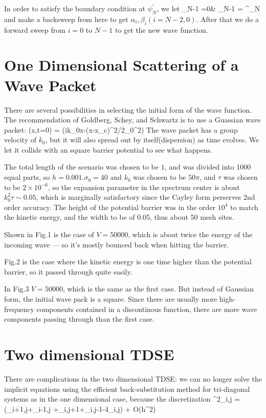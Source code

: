 In order to satisfy the boundary condition at $\psi^{\prime}_{N}$, we
let
\mm \alpha_{N-1} =0& \beta_{N-1} = \psi^{\prime}_{N} \md
and make a backsweep from here to get $\alpha_{i},\beta_{i}
(i=N-2,0)$. After that we do a forward sweep from $i=0$ to $N-1$ to
get the new wave function.

\section{One Dimensional Scattering of a Wave Packet}
There are several possibilities in selecting the initial form of the
wave function.  The recommendation of Goldberg, Schey, and Schwartz is
to use a Guassian wave packet:
\ee \Psi(x,t=0) = \exp(ik_{0}x-(x-x_{c})^{2}/2\sigma_{0}^{2}) \ed
The wave packet has a group velocity of $k_{0}$, but it will also
spread out by itself(dispersion) as time evolves. We let it collide
with an square barrier potential to see what happens.

The total length of the scenario was chosen to be $1$, and was divided
into 1000 equal parts, so $h=0.001$.$\sigma_{0} = 40$ and $k_{0}$ was
chosen to be $50\pi$, and $\tau$ was chosen to be $2\times 10^{-6}$,
so the expansion parameter in the spectrum center is about
$k_{0}^{2}\tau
\sim 0.05$, which is marginally satisfactory since the Cayley form
perserves 2nd order accuracy. The height of the potential barrier was
in the order $10^4$ to match the kinetic energy, and the width to be
of 0.05, thus about 50 mesh sites.

Shown in Fig.1 is the case of $V=50000$, which is about twice the
energy of the incoming wave --- so it's mostly bounced back when
hitting the barrier.

Fig.2 is the case where the kinetic energy is one time higher than the
potential barrier, so it passed through quite easily.

In Fig.3 $V=50000$, which is the same as the first case. But instead
of Gaussian form, the initial wave pack is a square. Since there are
usually more high-frequency components contained in a discontinous
function, there are more wave components passing through than the
first case.

\newpage {} \newpage {} \newpage {}

\section{Two dimensional TDSE}
There are complications in the two dimensional TDSE: we can no longer
solve the implicit equations using the efficient back-substitution
method for tri-diagonal systems as in the one dimensional case,
because the discretization
\ee \nabla^{2}\psi_{i,j} = (\psi_{i+1,j}+\psi_{i-1,j}
+\psi_{i,j+1}+\psi_{i,j-1}-4\psi_{i,j}) + {\cal O}(h^2) \ed

